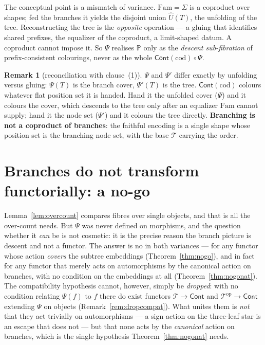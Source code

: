 \documentclass[11pt]{article}
\theoremstyle{definition}
\newtheorem{remark}[theorem]{Remark}
\newcommand{\Cont}{\mathsf{Cont}}
\newcommand{\Fam}{\mathrm{Fam}}
\newcommand{\cod}{\mathrm{cod}}
\newcommand{\op}{\mathrm{op}}
\newcommand{\Tree}{\mathcal{T}}
\newcommand{\Pfib}{\mathbb{P}}
\newcommand{\Uf}{\widehat{U}}
\newcommand{\Psip}{\Psi'}
\begin{document}
The conceptual point is a mismatch of variance. $\Fam=\Sigma$ is a coproduct over shapes; fed the
branches it yields the disjoint union $\Uf(T)$, the unfolding of the tree. Reconstructing the tree
is the \emph{opposite} operation --- a gluing that identifies shared prefixes, the equalizer of the
coproduct, a limit-shaped datum. A coproduct cannot impose it. So $\Psi$ realises $\Pfib$ only as the
\emph{descent sub-fibration} of prefix-consistent colourings, never as the whole $\Cont(\cod)\circ
\Psi$.

\begin{remark}[reconciliation with clause~(1)]\label{rem:reconcile}
$\Psi$ and $\Psip$ differ exactly by unfolding versus gluing: $\Psi(T)$ is the branch cover,
$\Psip(T)$ is the tree. $\Cont(\cod)$ colours whatever flat position set it is handed. Hand it the
unfolded cover ($\Psi$) and it colours the cover, which descends to the tree only after an equalizer
$\Fam$ cannot supply; hand it the node set ($\Psip$) and it colours the tree directly.
\textbf{Branching is not a coproduct of branches}: the faithful encoding is a single shape whose
position set is the branching node set, with the base $\Tree$ carrying the order.
\end{remark}

\section{Branches do not transform functorially: a no-go}\label{sec:nogo}

Lemma~\ref{lem:overcount} compares fibres over single objects, and that is all the over-count needs.
But $\Psi$ was never defined on morphisms, and the question whether it \emph{can} be is not
cosmetic: it is the precise reason the branch picture is descent and not a functor. The answer is
no in both variances --- for any functor whose action \emph{covers} the subtree embeddings
(Theorem~\ref{thm:nogo}), and in fact for any functor that merely acts on automorphisms by the
canonical action on branches, with no condition on the embeddings at all
(Theorem~\ref{thm:nogonat}). The compatibility hypothesis cannot, however, simply be
\emph{dropped}: with no condition relating $\Psi(f)$ to $f$ there do exist functors $\Tree\to\Cont$
and $\Tree^\op\to\Cont$ extending $\Psi$ on objects (Remark~\ref{rem:dropcompat}). What unites them is
\emph{not} that they act trivially on automorphisms --- a sign action on the three-leaf star is an
escape that does not --- but that none acts by the \emph{canonical} action on branches, which is the
single hypothesis Theorem~\ref{thm:nogonat} needs.
\end{document}
